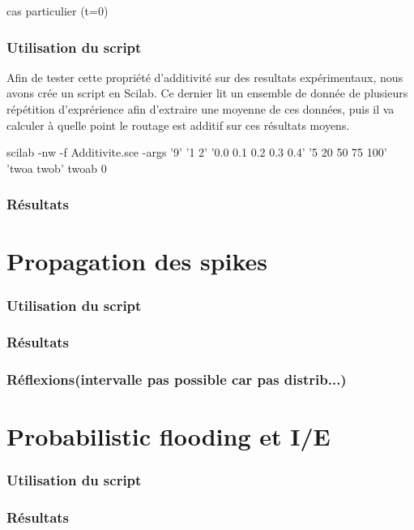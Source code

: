 \documentclass{report}
\begin{document}
cas particulier (t=0)

\section{Utilisation du script}

Afin de tester cette propriété d'additivité sur des resultats expérimentaux, nous avons crée un script en Scilab. Ce dernier lit un ensemble de donnée de plusieurs répétition d'exprérience afin d'extraire une moyenne de ces données, puis il va calculer à quelle point le routage est additif sur ces résultats moyens.



scilab -nw -f Additivite.sce -args '9' '1 2' '0.0 0.1 0.2 0.3 0.4' '5 20 50 75 100' 'twoa twob' twoab 0

\section{Résultats}


\part{Propagation des spikes}
\section{Utilisation du script}
\section{Résultats}
\section{Réflexions(intervalle pas possible car pas distrib...)}

\part{Probabilistic flooding et I/E}
\section{Utilisation du script}
\section{Résultats}
\end{document}
